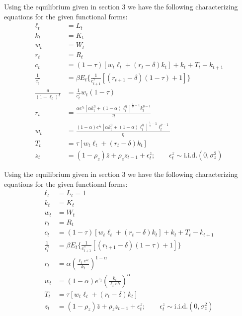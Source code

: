 \documentclass[letterpaper,11pt]{article}
\theoremstyle{definition}
\begin{document}
\begin{spacing}{1.5}
	\begin{Exercise} \label{DSGE_HW_CharEq_CES}
		Using the equilibrium given in section 3 we have the following characterizing equations for the given functional forms:
		\begin{align*}
			\ell_t &= L_t \\
			k_t &= K_t \\
			w_t &= W_t \\
			r_t &= R_t \\
			c_t &= (1-\tau)[w_t\ell_t+(r_t-\delta)k_t]+k_t+T_t-k_{t+1} \\
			\frac{1}{c_t^\gamma} &=  \beta E_t \{\frac{1}{c_{t+1}^\gamma}[(r_{t+1}-\delta)(1-\tau)+1]\} \\
			\frac{a}{(1-\ell_t)^\xi} &= \frac{1}{c_t^\gamma} w_t(1-\tau) \\
			r_t&= \frac{\alpha e^{z_t}[\alpha k_t^{\eta}+(1-\alpha)\ell_t^\eta]^{\frac{1}{\eta}-1}k_t^{\eta-1}}{\eta}\\
			w_t&= \frac{(1-\alpha) e^{z_t}[\alpha k_t^{\eta}+(1-\alpha)\ell_t^\eta]^{\frac{1}{\eta}-1}\ell_t^{\eta-1}}{\eta}\\
			T_t &= \tau[w_t\ell_t+(r_t-\delta)k_t] \\
			z_t &= (1-\rho_z)\bar{z}+\rho_zz_{t-1}+\epsilon_t^z; \qquad \epsilon_t^z \sim \text{i.i.d.}(0,\sigma_z^2)
		\end{align*}
	\end{Exercise}

	\begin{Exercise} \label{DSGE_HW_NoLeisure}
		Using the equilibrium given in section 3 we have the following characterizing equations for the given functional forms:
		\begin{align*}
			\ell_t &= L_t = 1 \\
			k_t &= K_t \\
			w_t &= W_t \\
			r_t &= R_t \\
			c_t &= (1-\tau)[w_t\ell_t+(r_t-\delta)k_t]+k_t+T_t-k_{t+1} \\
			\frac{1}{c_t^\gamma} &=  \beta E_t \{\frac{1}{c_{t+1}^\gamma}[(r_{t+1}-\delta)(1-\tau)+1]\} \\
			r_t&= \alpha (\frac{\ell_t e^{z_t}}{k_t})^{1-\alpha}\\
			w_t&= (1-\alpha)e^{z_t} (\frac{k_t}{\ell_t e^{z_t}})^{\alpha}\\
			T_t &= \tau[w_t\ell_t+(r_t-\delta)k_t] \\
			z_t &= (1-\rho_z)\bar{z}+\rho_zz_{t-1}+\epsilon_t^z; \qquad \epsilon_t^z \sim \text{i.i.d.}(0,\sigma_z^2)
		\end{align*}


\end{Exercise}
\end{spacing}
\end{document}
